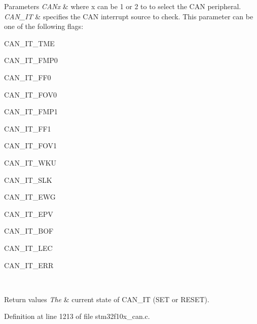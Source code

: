 \begin{DoxyParams}{Parameters}
{\em C\+A\+Nx} & where x can be 1 or 2 to to select the C\+AN peripheral. \\
\hline
{\em C\+A\+N\+\_\+\+IT} & specifies the C\+AN interrupt source to check. This parameter can be one of the following flags\+:
\begin{DoxyItemize}
\item C\+A\+N\+\_\+\+I\+T\+\_\+\+T\+ME
\item C\+A\+N\+\_\+\+I\+T\+\_\+\+F\+M\+P0
\item C\+A\+N\+\_\+\+I\+T\+\_\+\+F\+F0
\item C\+A\+N\+\_\+\+I\+T\+\_\+\+F\+O\+V0
\item C\+A\+N\+\_\+\+I\+T\+\_\+\+F\+M\+P1
\item C\+A\+N\+\_\+\+I\+T\+\_\+\+F\+F1
\item C\+A\+N\+\_\+\+I\+T\+\_\+\+F\+O\+V1
\item C\+A\+N\+\_\+\+I\+T\+\_\+\+W\+KU
\item C\+A\+N\+\_\+\+I\+T\+\_\+\+S\+LK
\item C\+A\+N\+\_\+\+I\+T\+\_\+\+E\+WG
\item C\+A\+N\+\_\+\+I\+T\+\_\+\+E\+PV
\item C\+A\+N\+\_\+\+I\+T\+\_\+\+B\+OF
\item C\+A\+N\+\_\+\+I\+T\+\_\+\+L\+EC
\item C\+A\+N\+\_\+\+I\+T\+\_\+\+E\+RR 
\end{DoxyItemize}\\
\hline
\end{DoxyParams}

\begin{DoxyRetVals}{Return values}
{\em The} & current state of C\+A\+N\+\_\+\+IT (S\+ET or R\+E\+S\+ET). \\
\hline
\end{DoxyRetVals}


Definition at line 1213 of file stm32f10x\+\_\+can.\+c.

\mbox{\label{group___c_a_n___private___functions_gaaee721a392b6b21bfd15dc160aeb6924}} 

